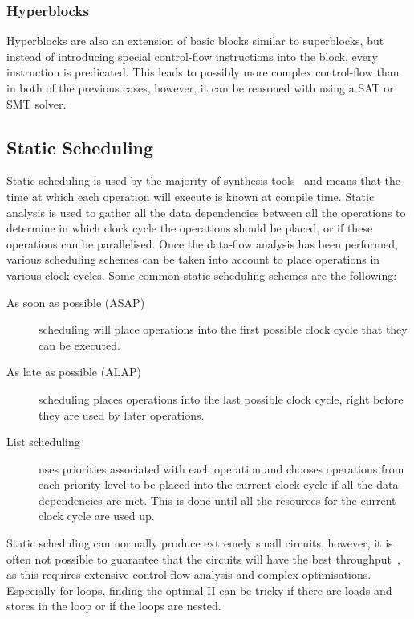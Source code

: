 \subsubsection{Hyperblocks}

Hyperblocks are also an extension of basic blocks similar to superblocks, but instead of introducing
special control-flow instructions into the block, every instruction is predicated.  This leads to
possibly more complex control-flow than in both of the previous cases, however, it can be reasoned
with using a \gls{SAT} or \gls{SMT} solver.

\subsection{Static Scheduling}%
\label{sec:static_scheduling}

Static scheduling is used by the majority of synthesis
tools~\cite{canis13_legup,xilinx20_vivad_high_synth,mentor20_catap_high_level_synth,intel20_sdk_openc_applic}
and means that the time at which each operation will execute is known at compile time.  Static
analysis is used to gather all the data dependencies between all the operations to determine in
which clock cycle the operations should be placed, or if these operations can be parallelised.  Once
the data-flow analysis has been performed, various scheduling schemes can be taken into account to
place operations in various clock cycles.  Some common static-scheduling schemes are the following:

\begin{description}
\item[As soon as possible (ASAP)] scheduling will place operations into
  the first possible clock cycle that they can be executed.

\item[As late as possible (ALAP)] scheduling places operations into the last
  possible clock cycle, right before they are used by later operations.

\item[List scheduling] uses priorities associated with each operation and
  chooses operations from each priority level to be placed into the current
  clock cycle if all the data-dependencies are met.  This is done until all the
  resources for the current clock cycle are used up.
\end{description}

Static scheduling can normally produce extremely small circuits, however, it is often not possible
to guarantee that the circuits will have the best
throughput~\cite{cheng20_combin_dynam_static_sched_high_level_synth}, as this requires extensive
control-flow analysis and complex optimisations.  Especially for loops, finding the optimal \gls{II} can
be tricky if there are loads and stores in the loop or if the loops are nested.

